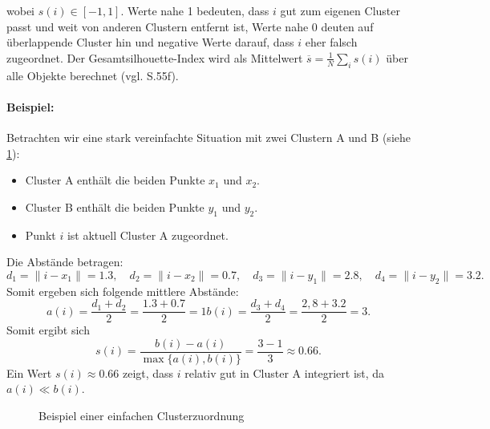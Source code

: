 wobei $s(i)\in[-1,1]$. Werte
nahe 1 bedeuten, dass $i$ gut zum eigenen Cluster passt und weit von anderen
Clustern entfernt ist, Werte nahe $0$ deuten auf überlappende Cluster hin und
negative Werte darauf, dass $i$ eher falsch zugeordnet.
Der Gesamtsilhouette-Index wird als Mittelwert $\overline{s} =
\frac{1}{N}\sum_i s(i)$ über alle Objekte berechnet (vgl. \cite{Rousseeuw1987} S.55f). 

\paragraph{Beispiel:} Betrachten wir eine stark vereinfachte Situation mit zwei Clustern A und B (siehe \ref{fig:silhouette_example}):
\begin{itemize}
  \item Cluster A enthält die beiden Punkte $x_1$ und $x_2$.
  \item Cluster B enthält die beiden Punkte $y_1$ und $y_2$.
  \item Punkt $i$ ist aktuell Cluster A zugeordnet.
\end{itemize}
Die Abstände betragen:
\[
  d_1 = \|i - x_1\| = 1.3,
  \quad d_2 = \|i - x_2\| = 0.7,
  \quad d_3 = \|i - y_1\| = 2.8,
  \quad d_4 = \|i - y_2\| = 3.2.
\]
Somit ergeben sich folgende mittlere Abstände:
\[
  a(i) = \frac{d_1 + d_2}{2} = \frac{1.3 + 0.7}{2} = 1
  b(i) = \frac{d_3 + d_4}{2} = \frac{2,8 + 3.2}{2} = 3.
\]
Somit ergibt sich
\[
  s(i) = \frac{b(i) - a(i)}{\max\{a(i), b(i)\}} = \frac{3 - 1}{3} \approx 0.66.
\]
Ein Wert $s(i) \approx 0.66$ zeigt, dass $i$ relativ gut in Cluster A integriert ist, da $a(i) \ll b(i)$.

\begin{figure}[ht]
  \centering
  \caption{Beispiel einer einfachen Clusterzuordnung}
  \label{fig:silhouette_example}
\end{figure}


